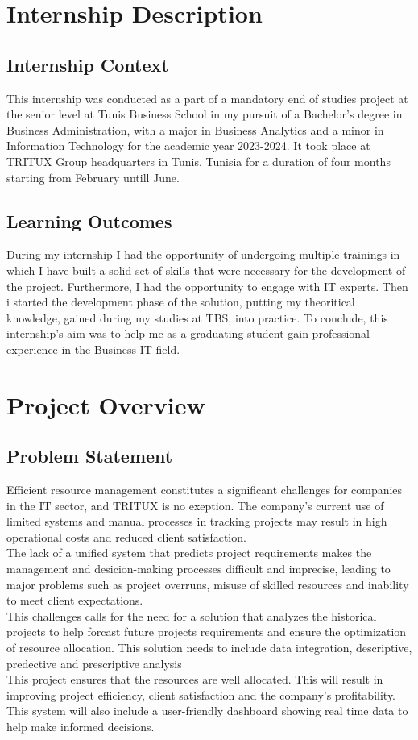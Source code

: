 \documentclass[11pt, a4paper]{report}
\begin{document}
      \section{Internship Description}
        \subsection{Internship Context}
          This internship was conducted as a part of a mandatory end of studies project at the senior level at Tunis Business School in my pursuit of a Bachelor's degree in Business Administration, with a major in Business Analytics and a minor in Information Technology for the academic year 2023-2024. It took place at TRITUX Group headquarters in Tunis, Tunisia for a duration of four months starting from February untill June.
        \subsection{Learning Outcomes}  
          During my internship I had the opportunity of undergoing multiple trainings in which I have built a solid set of skills that were necessary for the development of the project. Furthermore, I had the opportunity to engage with IT experts. Then i started the development phase of the solution, putting my theoritical knowledge, gained during my studies at TBS, into practice. To conclude, this internship's aim was to help me as a graduating student gain professional experience in the Business-IT field.           
        
      \section{Project Overview}
       \subsection{Problem Statement}
         Efficient resource management constitutes a significant challenges for companies in the IT sector, and TRITUX is no exeption. The company's current use of limited systems and manual processes in tracking projects may result in high operational costs and reduced client satisfaction.
         \\The lack of a unified system that predicts project requirements makes the management and desicion-making processes difficult and imprecise, leading to major problems such as project overruns, misuse of skilled resources and inability to meet client expectations.
         \\This challenges calls for the need for a solution that analyzes the historical projects to help forcast future projects requirements and ensure the optimization of resource allocation. This solution needs to include data integration, descriptive, predective and prescriptive analysis 
         \\This project ensures that the resources are well allocated. This will result in improving project efficiency, client satisfaction and the company's profitability. This system will also include a user-friendly dashboard showing real time data to help make informed decisions.
      
\end{document}
